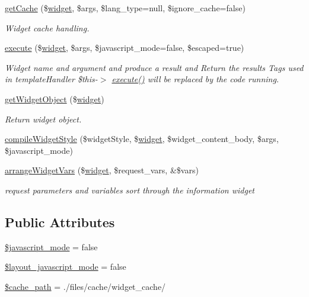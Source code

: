 \begin{DoxyCompactItemize}
\hyperlink{classwidgetController_ad866136705c196f9b7b231f58be317eb}{get\+Cache} (\$\hyperlink{classwidget}{widget}, \$args, \$lang\+\_\+type=null, \$ignore\+\_\+cache=false)
\begin{DoxyCompactList}\small\item\em Widget cache handling. \end{DoxyCompactList}\item 
\hyperlink{classwidgetController_a8344d21b83ae400500e70f371817a8d9}{execute} (\$\hyperlink{classwidget}{widget}, \$args, \$javascript\+\_\+mode=false, \$escaped=true)
\begin{DoxyCompactList}\small\item\em Widget name and argument and produce a result and Return the results Tags used in template\+Handler \$this-\/$>$ \hyperlink{classwidgetController_a8344d21b83ae400500e70f371817a8d9}{execute()} will be replaced by the code running. \end{DoxyCompactList}\item 
\hyperlink{classwidgetController_a15059522aa8548d03668025d20d6d152}{get\+Widget\+Object} (\$\hyperlink{classwidget}{widget})
\begin{DoxyCompactList}\small\item\em Return widget object. \end{DoxyCompactList}\item 
\hyperlink{classwidgetController_ad399f4e9088de6b63e479bfd68c1f2a0}{compile\+Widget\+Style} (\$widget\+Style, \$\hyperlink{classwidget}{widget}, \$widget\+\_\+content\+\_\+body, \$args, \$javascript\+\_\+mode)
\item 
\hyperlink{classwidgetController_a7f852fc1f0b521ff574f85ee067173ce}{arrange\+Widget\+Vars} (\$\hyperlink{classwidget}{widget}, \$request\+\_\+vars, \&\$vars)
\begin{DoxyCompactList}\small\item\em request parameters and variables sort through the information widget \end{DoxyCompactList}\end{DoxyCompactItemize}
\subsection*{Public Attributes}
\begin{DoxyCompactItemize}
\item 
\hyperlink{classwidgetController_a9879a9de581b205ffa63cc0297dcefab}{\$javascript\+\_\+mode} = false
\item 
\hyperlink{classwidgetController_ab123ebb549e616c6e67bf79e73f56ac8}{\$layout\+\_\+javascript\+\_\+mode} = false
\item 
\hyperlink{classwidgetController_a279375b189444d13250d8111910655c3}{\$cache\+\_\+path} = \textquotesingle{}./files/cache/widget\+\_\+cache/\textquotesingle{}
\end{DoxyCompactItemize}


